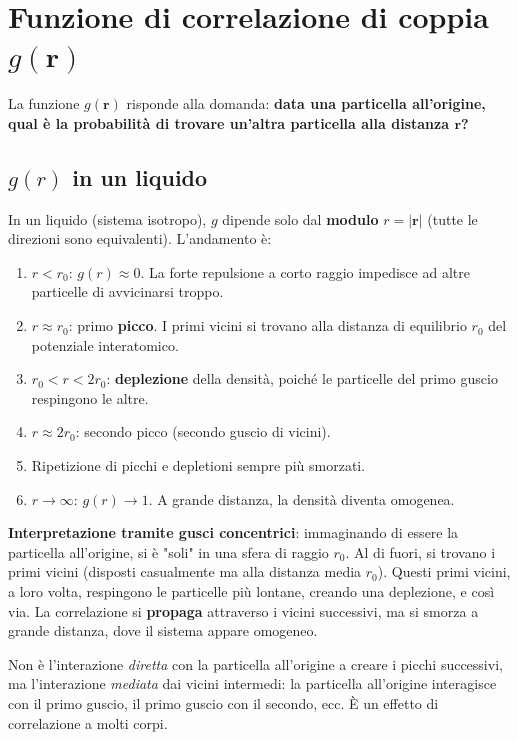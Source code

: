 \section{Funzione di correlazione di coppia $g(\mathbf{r})$}

La funzione $g(\mathbf{r})$ risponde alla domanda: \textbf{data una particella all'origine, qual è la probabilità di trovare un'altra particella alla distanza $\mathbf{r}$?}

\subsection{$g(r)$ in un liquido}

In un liquido (sistema isotropo), $g$ dipende solo dal \textbf{modulo} $r = |\mathbf{r}|$ (tutte le direzioni sono equivalenti). L'andamento è:

\begin{enumerate}
    \item \textbf{$r < r_0$}: $g(r) \approx 0$. La forte repulsione a corto raggio impedisce ad altre particelle di avvicinarsi troppo.
    \item \textbf{$r \approx r_0$}: primo \textbf{picco}. I primi vicini si trovano alla distanza di equilibrio $r_0$ del potenziale interatomico.
    \item \textbf{$r_0 < r < 2r_0$}: \textbf{deplezione} della densità, poiché le particelle del primo guscio respingono le altre.
    \item \textbf{$r \approx 2r_0$}: secondo picco (secondo guscio di vicini).
    \item Ripetizione di picchi e depletioni sempre più smorzati.
    \item \textbf{$r \to \infty$}: $g(r) \to 1$. A grande distanza, la densità diventa omogenea.
\end{enumerate}

\textbf{Interpretazione tramite gusci concentrici}: immaginando di essere la particella all'origine, si è "soli" in una sfera di raggio $r_0$. Al di fuori, si trovano i primi vicini (disposti casualmente ma alla distanza media $r_0$). Questi primi vicini, a loro volta, respingono le particelle più lontane, creando una deplezione, e così via. La correlazione si \textbf{propaga} attraverso i vicini successivi, ma si smorza a grande distanza, dove il sistema appare omogeneo.

\begin{nota}
Non è l'interazione \textit{diretta} con la particella all'origine a creare i picchi successivi, ma l'interazione \textit{mediata} dai vicini intermedi: la particella all'origine interagisce con il primo guscio, il primo guscio con il secondo, ecc. È un effetto di correlazione a molti corpi.
\end{nota}

